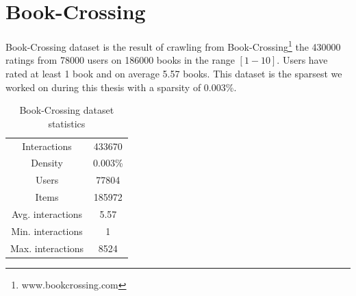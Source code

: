 \section{Book-Crossing}
Book-Crossing\cite{ziegler2005improving} dataset is the result of crawling from Book-Crossing\footnote{www.bookcrossing.com} the 430000 ratings from 78000 users on 186000 books in the range $[1-10]$. Users have rated at least 1 book and on average 5.57 books. This dataset is the sparsest we worked on during this thesis with a sparsity of 0.003\%.

\begin{table}[h!]
    \centering
    \begin{tabular}{c|c}
        \hline
        Interactions & 433670 \\
        Density & 0.003\% \\
        Users & 77804 \\
        Items & 185972 \\
        Avg. interactions & 5.57 \\
        Min. interactions & 1 \\
        Max. interactions & 8524 \\
        \hline
    \end{tabular}
    \caption{Book-Crossing dataset statistics}
    \label{tab:bx_stats}
\end{table}

